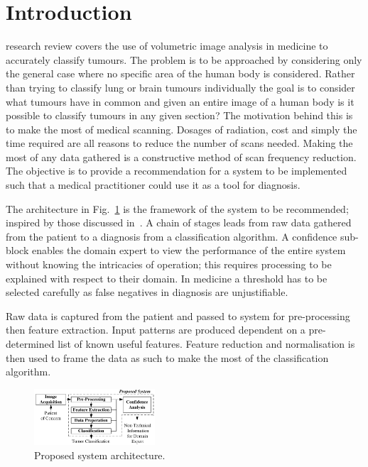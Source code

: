 \documentclass[journal]{IEEEtran}
\begin{document}
\section{Introduction}
 research review covers the use of volumetric image analysis in medicine to accurately classify tumours. 
The problem is to be approached by considering only the general case where no specific area of the human body is considered.
Rather than trying to classify lung or brain tumours individually the goal is to consider what tumours have in common and given an entire image of a human body is it possible to classify tumours in any given section?
The motivation behind this is to make the most of medical scanning.
Dosages of radiation, cost and simply the time required are all reasons to reduce the number of scans needed.
Making the most of any data gathered is a constructive method of scan frequency reduction.
The objective is to provide a recommendation for a system to be implemented such that a medical practitioner could use it as a tool for diagnosis.  

The architecture in Fig.~\ref{fig:Proposed} is the framework of the system to be recommended; inspired by those discussed in~\cite{ahmed2011efficacy,kumar2011classification,hau07feat,sachdeva2011multiclass,kostis03three}.
A chain of stages leads from raw data gathered from the patient to a diagnosis from a classification algorithm.
A confidence sub-block enables the domain expert to view the performance of the entire system without knowing the intricacies of operation; this requires processing to be explained with respect to their domain.
In medicine a threshold has to be selected carefully as false negatives in diagnosis are unjustifiable.

Raw data is captured from the patient and passed to system for pre-processing then feature extraction.
Input patterns are produced dependent on a pre-determined list of known useful features. 
Feature reduction and normalisation is then used to frame the data as such to make the most of the classification algorithm.

\begin{figure}[!htb]
   \centering
   \includegraphics[width = 0.4\textwidth]{Figures/Proposed.pdf}
   \caption{Proposed system architecture.}
   \label{fig:Proposed}
\end{figure}
\end{document}

